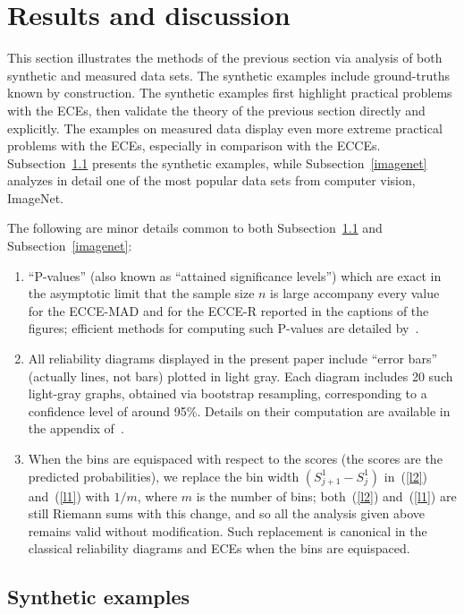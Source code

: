 \documentclass{article}
\begin{document}
\section{Results and discussion}
\label{results}

This section illustrates the methods of the previous section
via analysis of both synthetic and measured data sets.
The synthetic examples include ground-truths known by construction.
The synthetic examples first highlight practical problems with the ECEs,
then validate the theory of the previous section directly and explicitly.
The examples on measured data display even more extreme practical problems
with the ECEs, especially in comparison with the ECCEs.
Subsection~\ref{synthetic} presents the synthetic examples,
while Subsection~\ref{imagenet} analyzes in detail one of the most popular
data sets from computer vision, ImageNet.

The following are minor details common to both Subsection~\ref{synthetic}
and Subsection~\ref{imagenet}:
%
\begin{enumerate}
\item ``P-values'' (also known as ``attained significance levels'')
which are exact in the asymptotic limit that the sample size $n$ is large
accompany every value for the ECCE-MAD and for the ECCE-R
reported in the captions of the figures; efficient methods
for computing such P-values are detailed by~\cite{tygert_pvals}.
\item All reliability diagrams displayed in the present paper include
``error bars'' (actually lines, not bars) plotted in light gray.
Each diagram includes 20 such light-gray graphs,
obtained via bootstrap resampling, corresponding to a confidence level
of around 95\%. Details on their computation are available
in the appendix of~\cite{tygert_full}.
\item When the bins are equispaced with respect to the scores
(the scores are the predicted probabilities), we replace the bin width
$(S_{j+1}^1 - S_j^1)$ in~(\ref{l2}) and~(\ref{l1}) with $1/m$,
where $m$ is the number of bins;
both~(\ref{l2}) and~(\ref{l1}) are still Riemann sums with this change,
and so all the analysis given above remains valid without modification.
Such replacement is canonical in the classical reliability diagrams and ECEs
when the bins are equispaced.
\end{enumerate}


\subsection{Synthetic examples}
\label{synthetic}
\end{document}
